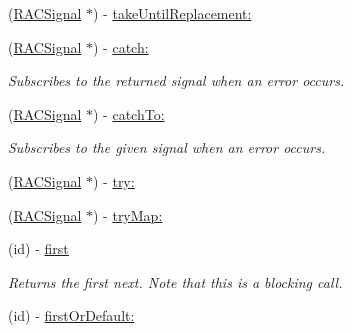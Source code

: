 \begin{DoxyCompactItemize}
(\mbox{\hyperlink{interface_r_a_c_signal}{R\+A\+C\+Signal}} $\ast$) -\/ \mbox{\hyperlink{category_r_a_c_signal_07_operations_08_aa8536c9726338e10176997936be011ed}{take\+Until\+Replacement\+:}}
\item 
\mbox{\label{category_r_a_c_signal_07_operations_08_a34c8a85e28adb1f26fcd769de19bc5bb}} 
(\mbox{\hyperlink{interface_r_a_c_signal}{R\+A\+C\+Signal}} $\ast$) -\/ \mbox{\hyperlink{category_r_a_c_signal_07_operations_08_a34c8a85e28adb1f26fcd769de19bc5bb}{catch\+:}}
\begin{DoxyCompactList}\small\item\em Subscribes to the returned signal when an error occurs. \end{DoxyCompactList}\item 
\mbox{\label{category_r_a_c_signal_07_operations_08_a0b1efe6d0548703cb25b8e436532e574}} 
(\mbox{\hyperlink{interface_r_a_c_signal}{R\+A\+C\+Signal}} $\ast$) -\/ \mbox{\hyperlink{category_r_a_c_signal_07_operations_08_a0b1efe6d0548703cb25b8e436532e574}{catch\+To\+:}}
\begin{DoxyCompactList}\small\item\em Subscribes to the given signal when an error occurs. \end{DoxyCompactList}\item 
(\mbox{\hyperlink{interface_r_a_c_signal}{R\+A\+C\+Signal}} $\ast$) -\/ \mbox{\hyperlink{category_r_a_c_signal_07_operations_08_ac65d7a1a19db9cb2f78c03781995bbe9}{try\+:}}
\item 
(\mbox{\hyperlink{interface_r_a_c_signal}{R\+A\+C\+Signal}} $\ast$) -\/ \mbox{\hyperlink{category_r_a_c_signal_07_operations_08_a282c8989886b5b9a75e4ecb298221b58}{try\+Map\+:}}
\item 
\mbox{\label{category_r_a_c_signal_07_operations_08_a06f71dd31099b1ed555f0b9fcbbdf6f1}} 
(id) -\/ \mbox{\hyperlink{category_r_a_c_signal_07_operations_08_a06f71dd31099b1ed555f0b9fcbbdf6f1}{first}}
\begin{DoxyCompactList}\small\item\em Returns the first {\ttfamily next}. Note that this is a blocking call. \end{DoxyCompactList}\item 
(id) -\/ \mbox{\hyperlink{category_r_a_c_signal_07_operations_08_a51f980781f2dc9e662278d7db7b0cd38}{first\+Or\+Default\+:}}

\end{DoxyCompactItemize}
